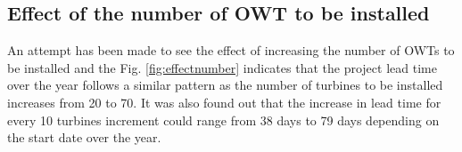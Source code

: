 \subsection{Effect of the number of OWT to be installed}

An attempt has been made to see the effect of increasing the number of OWTs to be installed and the Fig. \ref{fig:effectnumber} indicates that the project lead time over the year follows a similar pattern as the number of turbines to be installed increases from 20 to 70. It was also found out that the increase in lead time for every 10 turbines increment could range from 38 days to 79 days depending on the start date over the year.  

 